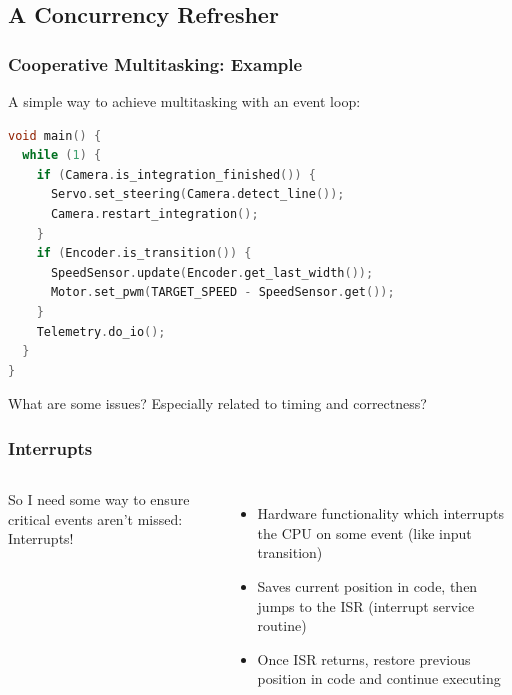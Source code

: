 \documentclass{beamer}
\begin{document}
\subsection{A Concurrency Refresher}
\begin{frame}[fragile]
\frametitle{Cooperative Multitasking: Example}
A simple way to achieve multitasking with an event loop:
\vspace{2px}
\begin{lstlisting}[language=C++,basicstyle=\ttfamily\scriptsize]
void main() {
  while (1) {
    if (Camera.is_integration_finished()) {
      Servo.set_steering(Camera.detect_line());
      Camera.restart_integration();
    }
    if (Encoder.is_transition()) {
      SpeedSensor.update(Encoder.get_last_width());
      Motor.set_pwm(TARGET_SPEED - SpeedSensor.get());
    }
    Telemetry.do_io();
  }
}
\end{lstlisting}
\vspace{2px}
What are some issues? Especially related to timing and correctness?
\end{frame}

\begin{frame}
\frametitle{Interrupts}
\begin{columns}[t]
So I need some way to ensure critical events aren't missed: Interrupts!
\begin{itemize}
  \item Hardware functionality which interrupts the CPU on some event (like input transition)
  \item Saves current position in code, then jumps to the ISR (interrupt service routine)
  \item Once ISR returns, restore previous position in code and continue executing
\end{itemize}

\end{columns}
\end{frame}
\end{document}

